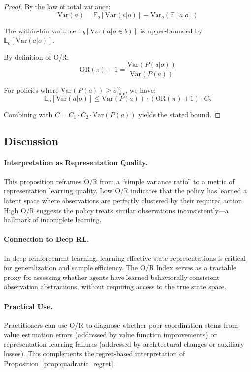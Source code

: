 \begin{proof}
By the law of total variance:
\begin{equation}
\text{Var}(a) = \mathbb{E}_o[\text{Var}(a|o)] + \text{Var}_o(\mathbb{E}[a|o])
\end{equation}

The within-bin variance $\mathbb{E}_b[\text{Var}(a | o \in b)]$ is upper-bounded by $\mathbb{E}_o[\text{Var}(a|o)]$.

By definition of O/R:
\begin{equation}
\text{OR}(\pi) + 1 = \frac{\text{Var}(P(a|o))}{\text{Var}(P(a))}
\end{equation}

For policies where $\text{Var}(P(a)) \geq \sigma^2_{\min}$, we have:
\begin{equation}
\mathbb{E}_o[\text{Var}(a|o)] \leq \text{Var}(P(a)) \cdot (\text{OR}(\pi) + 1) \cdot C_2
\end{equation}

Combining with $C = C_1 \cdot C_2 \cdot \text{Var}(P(a))$ yields the stated bound.
\end{proof}

\subsection{Discussion}

\paragraph{Interpretation as Representation Quality.}
This proposition reframes O/R from a ``simple variance ratio'' to a metric of representation learning quality. Low O/R indicates that the policy has learned a latent space where observations are perfectly clustered by their required action. High O/R suggests the policy treats similar observations inconsistently---a hallmark of incomplete learning.

\paragraph{Connection to Deep RL.}
In deep reinforcement learning, learning effective state representations is critical for generalization and sample efficiency. The O/R Index serves as a tractable proxy for assessing whether agents have learned behaviorally consistent observation abstractions, without requiring access to the true state space.

\paragraph{Practical Use.}
Practitioners can use O/R to diagnose whether poor coordination stems from value estimation errors (addressed by value function improvements) or representation learning failures (addressed by architectural changes or auxiliary losses). This complements the regret-based interpretation of Proposition~\ref{prop:quadratic_regret}.
